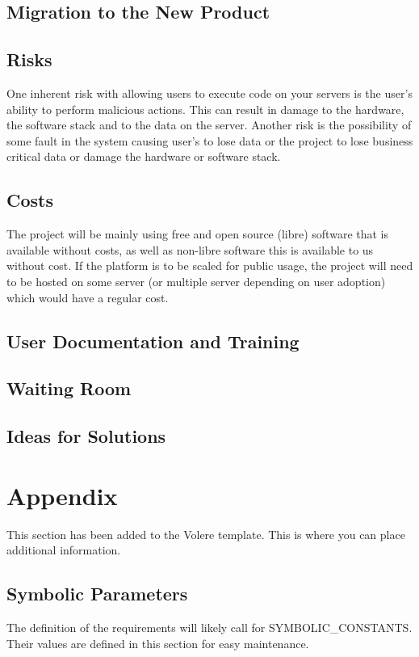 \documentclass[12pt, titlepage]{article}
\begin{document}
  \subsection{Migration to the New Product}

  \subsection{Risks}
  One inherent risk with allowing users to execute code on your servers is the
  user's ability to perform malicious actions. This can result in damage to the
  hardware, the software stack and to the data on the server.  Another risk is
  the possibility of some fault in the system causing user's to lose data or
  the project to lose business critical data or damage the hardware or software
  stack.

  \subsection{Costs}
  The project will be mainly using free and open source (libre) software that
  is available without costs, as well as non-libre software this is available
  to us without cost. If the platform is to be scaled for public usage, the
  project will need to be hosted on some server (or multiple server depending
  on user adoption) which would have a regular cost.

  \subsection{User Documentation and Training}

  \subsection{Waiting Room}

  \subsection{Ideas for Solutions}





\newpage

\section{Appendix}

This section has been added to the Volere template.  This is where you can
place additional information.

\subsection{Symbolic Parameters}

The definition of the requirements will likely call for SYMBOLIC\_CONSTANTS.
Their values are defined in this section for easy maintenance.
\end{document}
